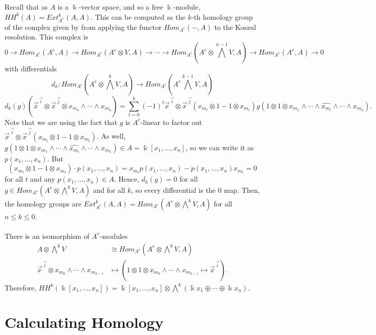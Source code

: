 \documentclass[12pt,a4paper]{article}
\newcommand{\kk}{\Bbbk}
\newcommand\1{_{(1)}}
\newcommand\2{_{(2)}}
\begin{document}
Recall that as $A$ is a $\kk$-vector space, and so a free $\kk$-module, $HH^k(A)=Ext_{A^e}^k(A,A)$.
This can be computed as the $k$-th homology group of the complex given by from applying the functor $Hom_{A^e}(-,A)$ to the Koszul resolution.
This complex is
\[
0\to Hom_{A^e}(A^e,A)\to Hom_{A^e}(A^e\otimes V,A)\to\cdots\to Hom_{A^e}(A^e\otimes\bigwedge^{n-1}V,A)\to Hom_{A^e}(A^e,A)\to 0  
\]
with differentials
\[
  d_k:Hom_{A^e}(A^e\otimes\bigwedge^k V, A)\to Hom_{A^e}(A^e\bigwedge^{k-1}V,A)
\]
\[
d_k(g)(\vec{x}^{\,\vec{i}}\otimes\vec{x}^{\,\vec{j}}\otimes x_{m_0}\wedge\cdots\wedge x_{m_k})= \sum_{t=0}^{k}(-1)^t\vec{x}^{\,\vec{i}}\otimes\vec{x}^{\,\vec{j}}(x_{m_t}\otimes1-1\otimes x_{m_t})g(1\otimes 1\otimes x_{m_1}\wedge\cdots\wedge\widehat{x_{m_t}}\wedge\cdots\wedge x_{m_k}).
\]
Note that we are using the fact that $g$ is $A^e$-linear to factor out $\vec{x}^{\,\vec{i}}\otimes\vec{x}^{\,\vec{j}}(x_{m_t}\otimes1-1\otimes x_{m_t})$.
As well, $g(1\otimes 1\otimes x_{m_1}\wedge\cdots\wedge\widehat{x_{m_t}}\wedge\cdots\wedge x_{m_k})\in A=\kk[x_1,\ldots,x_n]$, so we can write it as $p(x_1,\ldots,x_n)$.
But 
\[
  (x_{m_t}\otimes1-1\otimes x_{m_t})\cdot p(x_1,\ldots,x_n)=x_{m_t}p(x_1,\ldots,x_n)-p(x_1,\ldots,x_n)x_{m_t}=0
\]
for all $t$ and any $p(x_1,\ldots,x_n)\in A$.
Hence, $d_k(g)=0$ for all $g\in Hom_{A^e}(A^e\otimes\bigwedge^k V, A)$ and for all $k$, so every differential is the $0$ map.
Then, the homology groups are $Ext_{A^e}^k(A,A)=Hom_{A^e}(A^e\otimes\bigwedge^k V, A)$ for all $n\le k\le 0$.
\\\\
There is an isomorphism of $A^e$-modules 
\begin{align*}
  A\otimes \bigwedge^k V&\cong Hom_{A^e}(A^e\otimes\bigwedge^k V, A)\\
  \vec{x}^{\,\vec{i}}\otimes x_{m_0}\wedge\cdots\wedge x_{m_{k-1}}&\mapsto
  (1\otimes 1\otimes x_{m_0}\wedge\cdots\wedge x_{m_{k-1}}\mapsto \vec{x}^{\,\vec{i}}).
\end{align*}
Therefore, $HH^k(\kk[x_1,\ldots,x_n])=\kk[x_1,\ldots,x_n]\otimes\bigwedge^k\left(\kk x_1\oplus\cdots\oplus\kk x_n\right)$.

\section{Calculating Homology}
\end{document}
